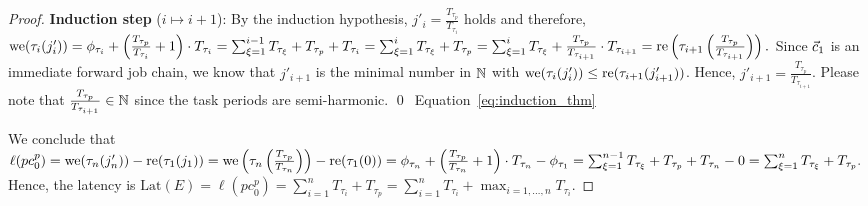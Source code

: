 \documentclass[10pt,conference]{resources/IEEEtran}
\theoremstyle{definition}
\theoremstyle{remark}
\newcommand{\lat}{\mathrm{Lat}}
\newcommand{\fc}{\fw{c}}
\newcommand{\pc}{{pc}}
\theoremstyle{definition}
\begin{document}
\begin{proof}
		\textbf{Induction step} ($i\mapsto i+1$):
		By the induction hypothesis, $j'_i = \frac{T_{\tau_p}}{T_{\tau_i}}$ holds and therefore, 
		\begin{math}
			\operatorname{we}(\tau_i(j'_i)) 
			= \phi_{\tau_i} + \left( \frac{T_{\tau_p}}{T_{\tau_i}} +1 \right)\cdot T_{\tau_i} 
			= \sum_{\xi = 1}^{i-1} T_{\tau_\xi} + T_{\tau_p} + T_{\tau_i}
			= \sum_{\xi = 1}^{i} T_{\tau_\xi} + T_{\tau_p}
			= \sum_{\xi = 1}^{i} T_{\tau_\xi} + \frac{T_{\tau_p}}{T_{\tau_{i+1}}} \cdot T_{\tau_{i+1}}
			= \operatorname{re}\left(\tau_{i+1}\left(\frac{T_{\tau_p}}{T_{\tau_{i+1}}}\right)\right).
		\end{math}
		Since $\fc_1$ is an immediate forward job chain, we know that $j'_{i+1}$ is the minimal number in $\mathbb{N}$ with $\operatorname{we}(\tau_i(j'_{i})) \leq \operatorname{re}(\tau_{i+1}(j'_{i+1}))$.
		Hence, 
		$j'_{i+1} = \frac{T_{\tau_p}}{T_{\tau_{i+1}}}$.
		Please note that $\frac{T_{\tau_p}}{T_{\tau_{i+1}}} \in \mathbb{N}$ since the task periods are semi-harmonic. 
		\qed~Equation~\eqref{eq:induction_thm}

		We conclude that 
		\begin{math}
			\ell(\pc^p_0) 
			= \we(\tau_n(j'_n)) - \re(\tau_1(j_1)) 
			= \we\left(\tau_n\left(\frac{T_{\tau_p}}{T_{\tau_n}}\right)\right) - \re(\tau_1(0)) 
			= \phi_{\tau_n} + \left(\frac{T_{\tau_p}}{T_{\tau_n}} +1 \right) \cdot T_{\tau_n} - \phi_{\tau_1}
			= \sum_{\xi=1}^{n-1} T_{\tau_\xi} + T_{\tau_p} + T_{\tau_n} - 0
			= \sum_{\xi=1}^{n} T_{\tau_\xi} + T_{\tau_p}.
		\end{math}
		Hence, the latency is 
		$\lat(E) = \ell(\pc^p_0) = \sum_{i=1}^{n} T_{\tau_i} + T_{\tau_p} = \sum_{i=1}^{n} T_{\tau_i} + \max_{i=1, \dots, n} T_{\tau_i}$.
	\end{proof}
\end{document}
